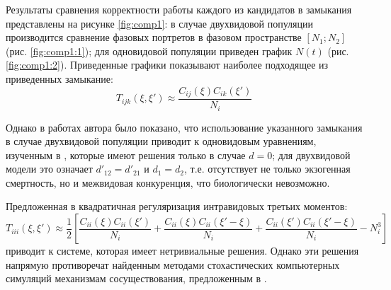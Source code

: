 Результаты сравнения корректности работы каждого из кандидатов в замыкания представлены на рисунке \ref{fig:comp1}: в случае двухвидовой популяции производится сравнение фазовых портретов в фазовом пространстве $[N_1; N_2]$ (рис. \ref{fig:comp1:1}); для одновидовой популяции приведен график $N(t)$ (рис. \ref{fig:comp1:2}). Приведенные графики показывают наиболее подходящее из приведенных замыкание:
\begin{equation*}
T_{ijk}(\xi,\xi')\approx\frac{C_{ij}(\xi)C_{ik}(\xi')}{N_{i}}
\end{equation*}

Однако в работах автора \cite{as1, as2} было показано, что использование указанного замыкания в случае двухвидовой популяции приводит к одновидовым уравнениям, изученным в \cite{nik}, которые имеют решения только в случае $d=0$; для двухвидовой модели это означает $d'_{12}=d'_{21}$ и  $d_1=d_2$, т.е. отсутствует не только экзогенная смертность, но и межвидовая конкуренция, что биологически невозможно.

Предложенная в \cite{as2} квадратичная регуляризация интравидовых третьих моментов:
\begin{equation*}
T_{iii}(\xi,\xi')\approx\frac{1}{2}\left[\frac{C_{ii}(\xi)C_{ii}(\xi')}{N_{i}}+\frac{C_{ii}(\xi)C_{ii}(\xi'-\xi)}{N_{i}}+\frac{C_{ii}(\xi')C_{ii}(\xi'-\xi)}{N_{i}}-N^3_{i}\right]
\end{equation*}
приводит к системе, которая имеет нетривиальные решения. Однако эти решения напрямую противоречат найденным методами стохастических компьютерных симуляций механизмам сосуществования, предложенным в \cite{MURRELL}.

